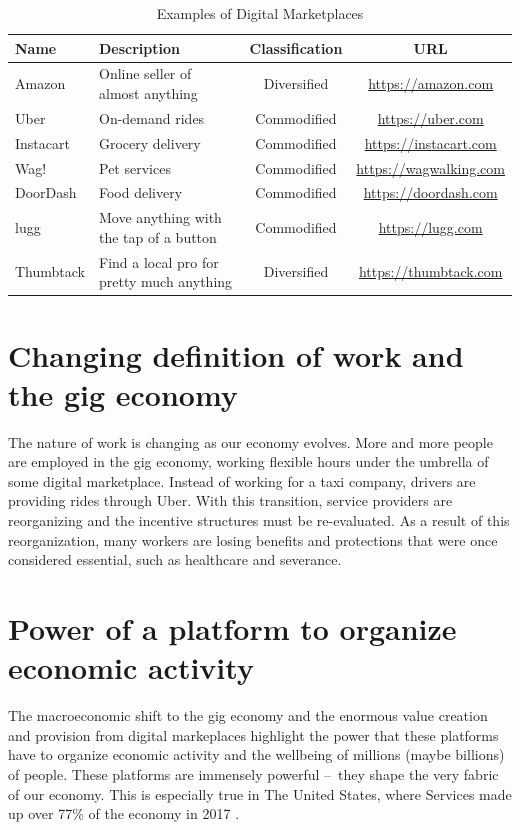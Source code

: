 \begin{table}
  \begin{center}
  \begin{tabular}{|l|p{4cm}|c|c|}
  \hline
  {\sc Name}  &  {\sc Description} & {\sc Classification} & {\sc URL} \\
  \hline
  Amazon          & Online seller of almost anything & Diversified & \url{https://amazon.com} \\
  \hline
  Uber      & On-demand rides & Commodified & \url{https://uber.com} \\
  \hline
  Instacart    & Grocery delivery & Commodified & \url{https://instacart.com} \\
  \hline
  Wag!  & Pet services & Commodified & \url{https://wagwalking.com} \\
  \hline
  DoorDash  & Food delivery & Commodified & \url{https://doordash.com} \\
  \hline
  lugg  & Move anything with the tap of a button & Commodified & \url{https://lugg.com} \\
  \hline
  Thumbtack  & Find a local pro for pretty much anything & Diversified & \url{https://thumbtack.com} \\
  \hline
  \end{tabular}
  \end{center}
  \caption{Examples of Digital Marketplaces}
  \label{digital_marketplaces}
  \end{table}

\section{Changing definition of work and the gig economy}
The nature of work is changing as our economy evolves. More and more people are employed in the gig economy, working flexible hours under the umbrella of some digital marketplace. Instead of working for a taxi company, drivers are providing rides through Uber. With this transition, service providers are reorganizing and the incentive structures must be re-evaluated. As a result of this reorganization, many workers are losing benefits and protections that were once considered essential, such as healthcare and severance.

\section{Power of a platform to organize economic activity}
The macroeconomic shift to the gig economy and the enormous value creation and provision from digital markeplaces highlight the power that these platforms have to organize economic activity and the wellbeing of millions (maybe billions) of people. These platforms are immensely powerful – they shape the very fabric of our economy. This is especially true in The United States, where  Services made up over 77\% of the economy in 2017 \citep{economyDistribution}.

